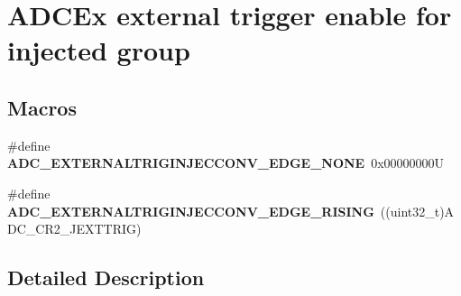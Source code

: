 \hypertarget{group___a_d_c_ex___external__trigger__edge___injected}{}\section{A\+D\+C\+Ex external trigger enable for injected group}
\label{group___a_d_c_ex___external__trigger__edge___injected}
\subsection*{Macros}
\begin{DoxyCompactItemize}
\item 
\mbox{\label{group___a_d_c_ex___external__trigger__edge___injected_ga5ef4af64eb11cd75fac665eb7dce016b}} 
\#define {\bfseries A\+D\+C\+\_\+\+E\+X\+T\+E\+R\+N\+A\+L\+T\+R\+I\+G\+I\+N\+J\+E\+C\+C\+O\+N\+V\+\_\+\+E\+D\+G\+E\+\_\+\+N\+O\+NE}~0x00000000U
\item 
\mbox{\label{group___a_d_c_ex___external__trigger__edge___injected_ga79010c28c68ef0c2a19c021adcf983d2}} 
\#define {\bfseries A\+D\+C\+\_\+\+E\+X\+T\+E\+R\+N\+A\+L\+T\+R\+I\+G\+I\+N\+J\+E\+C\+C\+O\+N\+V\+\_\+\+E\+D\+G\+E\+\_\+\+R\+I\+S\+I\+NG}~((uint32\+\_\+t)A\+D\+C\+\_\+\+C\+R2\+\_\+\+J\+E\+X\+T\+T\+R\+IG)
\end{DoxyCompactItemize}


\subsection{Detailed Description}
